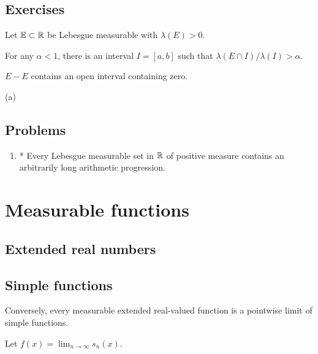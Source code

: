 \documentclass{../note}
\begin{document}
\begin{prb}
\end{prb}


\section*{Exercises}

\begin{prb}
Let $\mathbb{E}\subset\mathbb{R}$ be Lebesgue measurable with $\lambda(E)>0$.
\begin{parts}
\item For any $\alpha<1$, there is an interval $I=[a,b]$ such that $\lambda(E\cap I)/\lambda(I)>\alpha$.
\item $E-E$ contains an open interval containing zero.
\end{parts}
\begin{pf}
(a)
\end{pf}
\end{prb}




\section*{Problems}
\begin{enumerate}
\item* Every Lebesgue measurable set in $\mathbb{R}$ of positive measure contains an arbitrarily long arithmetic progression.
\end{enumerate}

















\chapter{Measurable functions}

\section{Extended real numbers}


\section{Simple functions}
\begin{prb}

Conversely, every measurable extended real-valued function is a pointwise limit of simple functions.

\end{prb}
\begin{pf}
Let $f(x)=\lim_{n\to\infty}s_n(x)$.

\end{pf}
\end{document}
